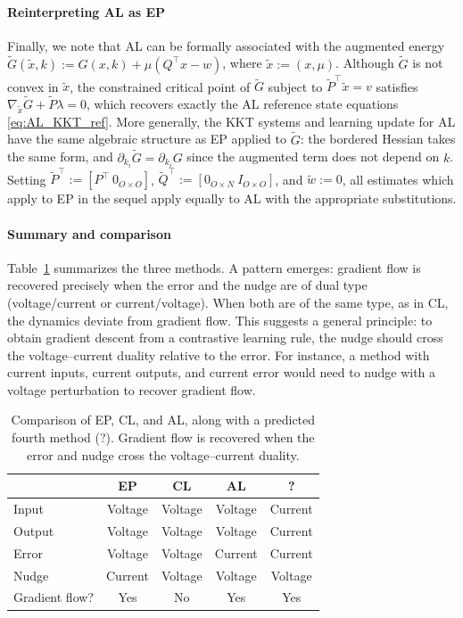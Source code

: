 \documentclass{siamart}
\begin{document}
\paragraph{Reinterpreting AL as EP}
Finally, we note that AL can be formally associated with the augmented energy $\tilde{G}(\tilde{x},k):=G(x,k) +\mu (Q^\top x-w)$, where $\tilde{x} := (x,\mu)$. Although $\tilde{G}$ is not convex in $\tilde{x}$, the constrained critical point of $\tilde{G}$ subject to $\tilde{P}^\top \tilde{x} = v$ satisfies $\nabla_{\tilde{x}}\tilde{G} + \tilde{P}\lambda = 0$, which recovers exactly the AL reference state equations \eqref{eq:AL_KKT_ref}. More generally, the KKT systems and learning update for AL have the same algebraic structure as EP applied to $\tilde{G}$: the bordered Hessian takes the same form, and $\partial_{k_i}\tilde{G} = \partial_{k_i}G$ since the augmented term does not depend on $k$. Setting $\tilde{P}^\top := [P^\top \ 0_{O \times O}]$, $\tilde{Q}^\top := [0_{O \times N} \ I_{O \times O}]$, and $\tilde{w}:=0$, all estimates which apply to EP in the sequel apply equally to AL with the appropriate substitutions.

\paragraph{Summary and comparison}
Table~\ref{tab:comparison} summarizes the three methods. A pattern emerges: gradient flow is recovered precisely when the error and the nudge are of dual type (voltage/current or current/voltage). When both are of the same type, as in CL, the dynamics deviate from gradient flow. This suggests a general principle: to obtain gradient descent from a contrastive learning rule, the nudge should cross the voltage--current duality relative to the error. For instance, a method with current inputs, current outputs, and current error would need to nudge with a voltage perturbation to recover gradient flow.
\begin{table}[h]
\centering
\begin{tabular}{|l|c|c|c|c|}
\hline
 & EP & CL & AL & ? \\
\hline
Input & Voltage & Voltage & Voltage & Current \\
Output & Voltage & Voltage & Voltage & Current \\
\rowcolor{gray!20} Error & Voltage & Voltage & Current & Current \\
\rowcolor{gray!20} Nudge & Current & Voltage & Voltage & Voltage \\
\rowcolor{gray!20} Gradient flow? & Yes & No & Yes & Yes \\
\hline
\end{tabular}
\caption{Comparison of EP, CL, and AL, along with a predicted fourth method (?). Gradient flow is recovered when the error and nudge cross the voltage--current duality.}
\label{tab:comparison}
\end{table}
\end{document}
